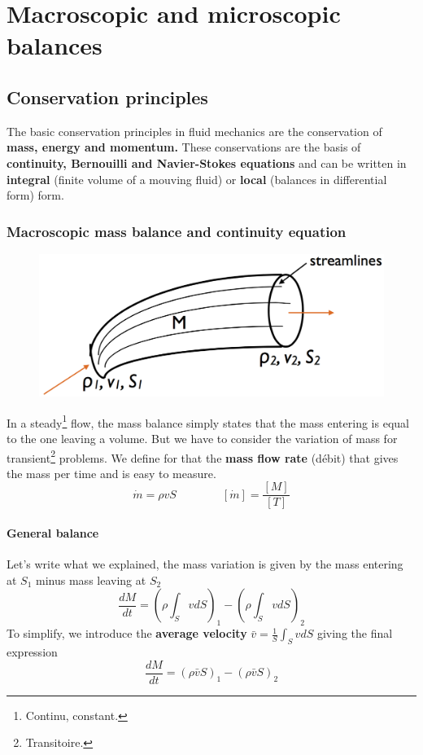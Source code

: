 
\chapter{Macroscopic and microscopic balances}
\section{Conservation principles}
	The basic conservation principles in fluid mechanics are the conservation of \textbf{mass, energy and momentum.} These conservations are the basis of \textbf{continuity, Bernouilli and Navier-Stokes equations} and can be written in \textbf{integral} (finite volume of a mouving fluid) or \textbf{local} (balances in differential form) form. 
	
	\subsection{Macroscopic mass balance and continuity equation}
		\begin{figure}
		\vspace{-5mm}
		\includegraphics[scale=0.20]{ch2/1}
		\end{figure}
		In a steady\footnote{Continu, constant.} flow, the mass balance simply states that the mass entering is equal to the one leaving a volume. But we have to consider the variation of mass for transient\footnote{Transitoire.} problems. We define for that the  \textbf{mass flow rate} (débit) that gives the mass per time and is easy to measure. 
		\begin{equation}
			\dot{m} = \rho v S \qquad \qquad [\dot{m}] = \frac{[M]}{[T]}
		\end{equation}
		
		\subsubsection{General balance}
		Let's write what we explained, the mass variation is given by the mass entering at $S_1$ minus mass leaving at $S_2$		
		\begin{equation}
			\frac{dM}{dt} = \left(\rho \int _{S} v dS\right)_1 - \left(\rho \int _{S} v dS\right)_2
		\end{equation}
		To simplify, we introduce the \textbf{average velocity} $\bar{v} = \frac{1}{S}\int _S vdS$	giving the final expression
		\begin{equation}
			\frac{dM}{dt} = \left(\rho \bar{v} S\right)_1 - \left(\rho \bar{v} S\right)_2
		\end{equation}

